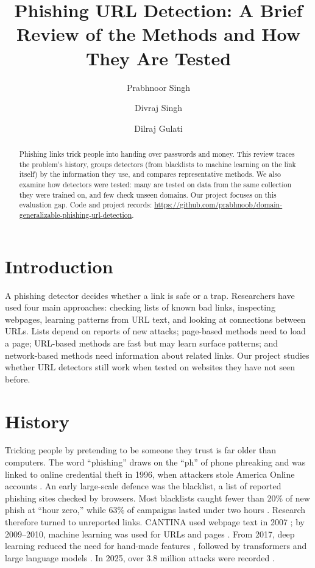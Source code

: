 \documentclass[sigconf,nonacm]{acmart}
\begin{document}
\title{Phishing URL Detection: A Brief Review of the Methods and How They Are Tested}
\author{Prabhnoor Singh}
\author{Divraj Singh}
\author{Dilraj Gulati}
\begin{abstract}
Phishing links trick people into handing over passwords and money. This review traces the problem's history, groups detectors (from blacklists to machine learning on the link itself) by the information they use, and compares representative methods. We also examine how detectors were tested: many are tested on data from the same collection they were trained on, and few check unseen domains. Our project focuses on this evaluation gap. Code and project records: \url{https://github.com/prabhnoob/domain-generalizable-phishing-url-detection}.
\end{abstract}
\maketitle
\section{Introduction}
A phishing detector decides whether a link is safe or a trap. Researchers have used four main approaches: checking lists of known bad links, inspecting webpages, learning patterns from URL text, and looking at connections between URLs. Lists depend on reports of new attacks; page-based methods need to load a page; URL-based methods are fast but may learn surface patterns; and network-based methods need information about related links. Our project studies whether URL detectors still work when tested on websites they have not seen before.
\section{History}
Tricking people by pretending to be someone they trust is far older than computers. The word ``phishing'' draws on the ``ph'' of phone phreaking and was linked to online credential theft in 1996, when attackers stole America Online accounts \cite{gupta}. An early large-scale defence was the blacklist, a list of reported phishing sites checked by browsers. Most blacklists caught fewer than 20\% of new phish at ``hour zero,'' while 63\% of campaigns lasted under two hours \cite{sheng}. Research therefore turned to unreported links. CANTINA used webpage text in 2007 \cite{cantina}; by 2009--2010, machine learning was used for URLs and pages \cite{ma,whittaker}. From 2017, deep learning reduced the need for hand-made features \cite{bahnsen,urlnet}, followed by transformers \cite{urltran} and large language models \cite{llm}. In 2025, over 3.8 million attacks were recorded \cite{apwg}.
\end{document}
